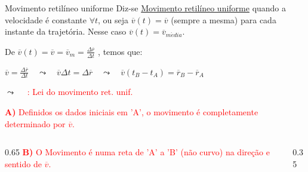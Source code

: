 \documentclass{beamer}
\begin{document}
	\begin{frame}{Movimento retilíneo uniforme}
		\small
		Diz-se \underline{Movimento retilíneo uniforme} quando a velocidade é constante $\forall t$, ou seja $\overline{v}(t) = \overline{v}$ (sempre a mesma) para cada instante da trajetória. Nesse caso $\overline{v}(t) = \overline{v}_{m\acute{e}dia}$.
		
		\vspace{0.4cm}
		De \quad $\displaystyle \overline{v}(t) = \overline{v} = \overline{v}_m = \frac{\Delta \overline{r}}{\Delta t}$ , \quad temos que:
		
		\vspace{0.4cm}
		$\displaystyle \overline{v} = \frac{\Delta \overline{r}}{\Delta t} \quad \leadsto \quad \overline{v} \Delta t = \Delta \overline{r} \quad \leadsto \quad \overline{v}(t_B - t_A) = \overline{r}_B - \overline{r}_A$
		
		\vspace{0.5cm}
		$\displaystyle \leadsto \quad$  \quad \textcolor{red}{: Lei do movimento ret. unif.}
		
		\vspace{0.6cm}
		\textcolor{red}{\textbf{A)} Definidos os dados iniciais em 'A', o movimento é completamente determinado por $\overline{v}$.}
		

		\begin{columns}[c]
			\begin{column}{0.65\textwidth}
				\textcolor{red}{\textbf{B)} O Movimento é numa reta de 'A' a 'B' (não curvo) na direção e sentido de $\overline{v}$.}
			\end{column}
			\begin{column}{0.35\textwidth}
				\vspace{-0.5cm}
				\begin{center}
				\end{center}
			\end{column}
		\end{columns}
	\end{frame}
	
\end{document}
